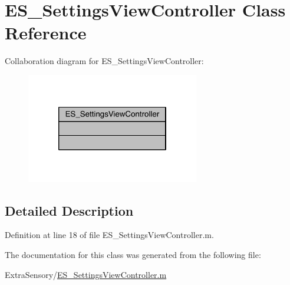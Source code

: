 \hypertarget{class_e_s___settings_view_controller}{\section{E\+S\+\_\+\+Settings\+View\+Controller Class Reference}
\label{class_e_s___settings_view_controller}
}


Collaboration diagram for E\+S\+\_\+\+Settings\+View\+Controller\+:\nopagebreak
\begin{figure}[H]
\begin{center}
\leavevmode
\includegraphics[width=214pt]{d0/d17/class_e_s___settings_view_controller__coll__graph}
\end{center}
\end{figure}


\subsection{Detailed Description}


Definition at line 18 of file E\+S\+\_\+\+Settings\+View\+Controller.\+m.



The documentation for this class was generated from the following file\+:\begin{DoxyCompactItemize}
\item 
Extra\+Sensory/\hyperlink{_e_s___settings_view_controller_8m}{E\+S\+\_\+\+Settings\+View\+Controller.\+m}\end{DoxyCompactItemize}
